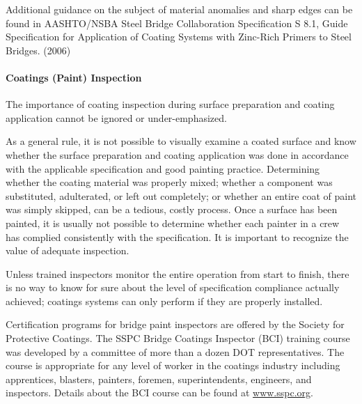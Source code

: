 Additional guidance on the subject of material anomalies and sharp edges can be found in AASHTO/NSBA Steel
Bridge Collaboration Specification S 8.1, Guide Specification for Application of Coating Systems with Zinc-Rich
Primers to Steel Bridges. (2006)

\paragraph{Coatings (Paint) Inspection}

The importance of coating inspection during surface preparation and coating application cannot be ignored or
under-emphasized.

As a general rule, it is not possible to visually examine a coated surface and know whether the surface
preparation and coating application was done in accordance with the applicable specification and good painting
practice. Determining whether the coating material was properly mixed; whether a component was substituted,
adulterated, or left out completely; or whether an entire coat of paint was simply skipped, can be a tedious, costly
process. Once a surface has been painted, it is usually not possible to determine whether each painter in a crew has
complied consistently with the specification. It is important to recognize the value of adequate inspection.

Unless trained inspectors monitor the entire operation from start to finish, there is no way to know for sure about
the level of specification compliance actually achieved; coatings systems can only perform if they are properly
installed.

Certification programs for bridge paint inspectors are offered by the Society for Protective Coatings. The SSPC
Bridge Coatings Inspector (BCI) training course was developed by a committee of more than a dozen DOT
representatives. The course is appropriate for any level of worker in the coatings industry including apprentices,
blasters, painters, foremen, superintendents, engineers, and inspectors. Details about the BCI course can be found at \url{www.sspc.org}.

